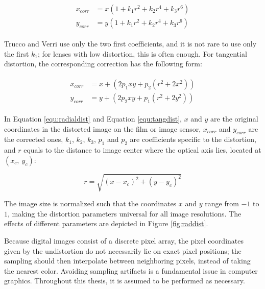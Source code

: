 \begin{align} \label{equ:radialdist} \begin{split}
	x_{corr} &= x(1 + k_1 r^2 + k_2 r^4 + k_3 r^6)\\
	y_{corr} &= y(1 + k_1 r^2 + k_2 r^4 + k_3 r^6)
\end{split} \end{align}


Trucco and Verri \cite{trucco1998introductory} use only the two first coefficients, and it is not rare to use only the first $k_1$; for lenses with low distortion, this is often enough.
For tangential distortion, the corresponding correction has the following form:

\begin{align} \label{equ:tangdist} \begin{split}
x_{corr} &= x + (2 p_1 x y + p_2 (r^2 + 2 x^2))\\
y_{corr} &= y + (2 p_2 x y + p_1 (r^2 + 2 y^2))
\end{split} \end{align}

In Equation \ref{equ:radialdist} and Equation \ref{equ:tangdist}, $x$ and $y$ are the original coordinates in the distorted image on the film or image sensor, $x_{corr}$ and $y_{corr}$ are the corrected ones, $k_1$, $k_2$, $k_3$, $p_1$ and $p_2$ are coefficients specific to the distortion, and $r$ equals to the distance to image center where the optical axis lies, located at $(x_c,~y_c)$:

\begin{equation}
r = \sqrt{(x - x_c)^2 + (y - y_c)^2}
\end{equation}


The image size is normalized such that the coordinates $x$ and $y$ range from $-1$ to $1$, making the distortion parameters universal for all image resolutions.
The effects of different parameters are depicted in Figure \ref{fig:raddist}.


Because digital images consist of a discrete pixel array, the pixel coordinates given by the undistortion do not necessarily lie on exact pixel positions; the sampling should then interpolate between neighboring pixels, instead of taking the nearest color.
Avoiding sampling artifacts is a fundamental issue in computer graphics.
\cite{wolberg1990digital}
Throughout this thesis, it is assumed to be performed as necessary.

